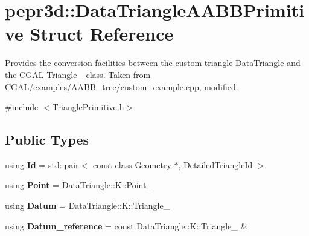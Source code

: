 \hypertarget{structpepr3d_1_1_data_triangle_a_a_b_b_primitive}{}\section{pepr3d\+::Data\+Triangle\+A\+A\+B\+B\+Primitive Struct Reference}
\label{structpepr3d_1_1_data_triangle_a_a_b_b_primitive}


Provides the conversion facilities between the custom triangle \mbox{\hyperlink{classpepr3d_1_1_data_triangle}{Data\+Triangle}} and the \mbox{\hyperlink{namespace_c_g_a_l}{C\+G\+AL}} Triangle\+\_ class. Taken from C\+G\+A\+L/examples/\+A\+A\+B\+B\+\_\+tree/custom\+\_\+example.\+cpp, modified.  




{\ttfamily \#include $<$Triangle\+Primitive.\+h$>$}

\subsection*{Public Types}
\begin{DoxyCompactItemize}
\item 
\mbox{\label{structpepr3d_1_1_data_triangle_a_a_b_b_primitive_a43fbba8b479b4508f52b69e8bb5836ac}} 
using {\bfseries Id} = std\+::pair$<$ const class \mbox{\hyperlink{classpepr3d_1_1_geometry}{Geometry}} $\ast$, \mbox{\hyperlink{structpepr3d_1_1_detailed_triangle_id}{Detailed\+Triangle\+Id}} $>$
\item 
\mbox{\label{structpepr3d_1_1_data_triangle_a_a_b_b_primitive_ad5e320270958d6054c0128bd803dc6da}} 
using {\bfseries Point} = Data\+Triangle\+::\+K\+::\+Point\+\_
\item 
\mbox{\label{structpepr3d_1_1_data_triangle_a_a_b_b_primitive_ae1cb31e643a04da18a42a869625f249b}} 
using {\bfseries Datum} = Data\+Triangle\+::\+K\+::\+Triangle\+\_
\item 
\mbox{\label{structpepr3d_1_1_data_triangle_a_a_b_b_primitive_a94e6b53c64384b020566cd57a5a7ba21}} 
using {\bfseries Datum\+\_\+reference} = const Data\+Triangle\+::\+K\+::\+Triangle\+\_ \&
\end{DoxyCompactItemize}
